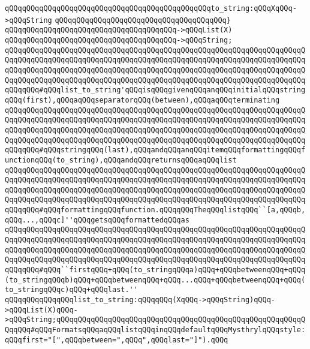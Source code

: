 \verb|qQQqqQQqqQQqqQQqqQQqqQQqqQQqqQQqqQQqqQQqqQQqqQQqto_string:qQQqXqQQq->qQQqString|\newline
\verb|qQQqqQQqqQQqqQQqqQQqqQQqqQQqqQQqqQQqqQQq}|\newline
\verb|qQQqqQQqqQQqqQQqqQQqqQQqqQQqqQQqqQQqqQQq->qQQqList(X)|\newline
\verb|qQQqqQQqqQQqqQQqqQQqqQQqqQQqqQQqqQQqqQQq->qQQqString;|\newline
\newline
\verb|qQQqqQQqqQQqqQQqqQQqqQQqqQQqqQQqqQQqqQQqqQQqqQQqqQQqqQQqqQQqqQQqqQQqqQQqqQQqqQQqqQQqqQQqqQQqqQQqqQQqqQQqqQQqqQQqqQQqqQQqqQQqqQQqqQQqqQQqqQQqqQQqqQQqqQQqqQQqqQQqqQQqqQQqqQQqqQQqqQQqqQQqqQQqqQQqqQQqqQQqqQQqqQQqqQQqqQQqqQQqqQQqqQQqqQQqqQQqqQQqqQQqqQQqqQQqqQQqqQQqqQQqqQQqqQQqqQQqqQQqqQQqqQQq#qQQqlist_to_string'qQQqisqQQqgivenqQQqanqQQqinitialqQQqstringqQQq(first),qQQqaqQQqseparatorqQQq(between),qQQqaqQQqterminating|\newline
\verb|qQQqqQQqqQQqqQQqqQQqqQQqqQQqqQQqqQQqqQQqqQQqqQQqqQQqqQQqqQQqqQQqqQQqqQQqqQQqqQQqqQQqqQQqqQQqqQQqqQQqqQQqqQQqqQQqqQQqqQQqqQQqqQQqqQQqqQQqqQQqqQQqqQQqqQQqqQQqqQQqqQQqqQQqqQQqqQQqqQQqqQQqqQQqqQQqqQQqqQQqqQQqqQQqqQQqqQQqqQQqqQQqqQQqqQQqqQQqqQQqqQQqqQQqqQQqqQQqqQQqqQQqqQQqqQQqqQQqqQQqqQQqqQQq#qQQqstringqQQq(last),qQQqandqQQqanqQQqitemqQQqformattingqQQqfunctionqQQq(to_string),qQQqandqQQqreturnsqQQqaqQQqlist|\newline
\verb|qQQqqQQqqQQqqQQqqQQqqQQqqQQqqQQqqQQqqQQqqQQqqQQqqQQqqQQqqQQqqQQqqQQqqQQqqQQqqQQqqQQqqQQqqQQqqQQqqQQqqQQqqQQqqQQqqQQqqQQqqQQqqQQqqQQqqQQqqQQqqQQqqQQqqQQqqQQqqQQqqQQqqQQqqQQqqQQqqQQqqQQqqQQqqQQqqQQqqQQqqQQqqQQqqQQqqQQqqQQqqQQqqQQqqQQqqQQqqQQqqQQqqQQqqQQqqQQqqQQqqQQqqQQqqQQqqQQqqQQqqQQqqQQq#qQQqformattingqQQqfunction.qQQqqQQqTheqQQqlistqQQq``[a,qQQqb,qQQq...,qQQqc]''qQQqgetsqQQqformattedqQQqas|\newline
\verb|qQQqqQQqqQQqqQQqqQQqqQQqqQQqqQQqqQQqqQQqqQQqqQQqqQQqqQQqqQQqqQQqqQQqqQQqqQQqqQQqqQQqqQQqqQQqqQQqqQQqqQQqqQQqqQQqqQQqqQQqqQQqqQQqqQQqqQQqqQQqqQQqqQQqqQQqqQQqqQQqqQQqqQQqqQQqqQQqqQQqqQQqqQQqqQQqqQQqqQQqqQQqqQQqqQQqqQQqqQQqqQQqqQQqqQQqqQQqqQQqqQQqqQQqqQQqqQQqqQQqqQQqqQQqqQQqqQQqqQQqqQQqqQQq#qQQq``firstqQQq+qQQq(to_stringqQQqa)qQQq+qQQqbetweenqQQq+qQQq(to_stringqQQqb)qQQq+qQQqbetweenqQQq+qQQq...qQQq+qQQqbetweenqQQq+qQQq(to_stringqQQqc)qQQq+qQQqlast.''|\newline
\newline
\newline
\verb|qQQqqQQqqQQqqQQqlist_to_string:qQQqqQQq(XqQQq->qQQqString)qQQq->qQQqList(X)qQQq->qQQqString;qQQqqQQqqQQqqQQqqQQqqQQqqQQqqQQqqQQqqQQqqQQqqQQqqQQqqQQqqQQqqQQq#qQQqFormatsqQQqaqQQqlistqQQqinqQQqdefaultqQQqMysthrylqQQqstyle:qQQqfirst="[",qQQqbetween=",qQQq",qQQqlast="]").qQQq|\newline
